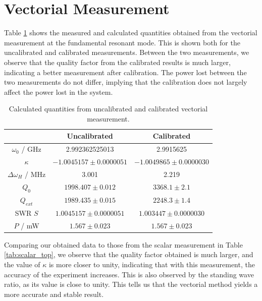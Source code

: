 \documentclass[a4paper]{report}
\numberwithin{equation}{section}
\begin{document}
\section{Vectorial Measurement}

Table \ref{tab:vectorial} shows the measured and calculated quantities obtained from the vectorial measurement at the fundamental resonant mode. This is 
shown both for the uncalibrated and calibrated measurements. Between the two measurements, we observe that the quality factor from the calibrated results
is much larger, indicating a better measurement after calibration. The power lost between the two measurements do not differ, implying that the calibration
does not largely affect the power lost in the system. \par 

\begin{table}[h!]
	\centering
	\begin{tabular}{|c|c|c|}
		\hline  & \textbf{Uncalibrated} & \textbf{Calibrated} \\ 
		\hline $\omega_0$ / GHz & 2.992362525013 & 2.9915625 \\
		\hline $\kappa$ & $-1.0045157 \pm 0.0000051$ & $-1.0049865\pm 0.0000030$ \\
		\hline $\Delta\omega_H$ / MHz & 3.001 & 2.219 \\
		\hline $Q_0$  & $1998.407 \pm 0.012$  & $3368.1 \pm 2.1$  \\
		\hline $Q_{ext}$ & $1989.435 \pm 0.015$ & $2248.3 \pm 1.4$ \\
		\hline SWR $S$ & $1.0045157 \pm 0.0000051$ & $1.003447 \pm 0.0000030$ \\
		\hline $P$ / mW & $1.567 \pm 0.023$ & $1.567 \pm 0.023$\\ 
		\hline   
	\end{tabular}
	\caption{Calculated quantities from uncalibrated and calibrated vectorial measurement. }
	\label{tab:vectorial}
\end{table}

Comparing our obtained data to those from the scalar measurement in Table \ref{tab:scalar_top}, we observe that the quality factor obtained is much larger, and the value of $\kappa$ is more
closer to unity, indicating that with this measurement, the accuracy of the experiment increases. This is also observed by the standing wave ratio, as its value is close to unity. This tells
us that the vectorial method yields a more accurate and stable result. \par
\end{document}
